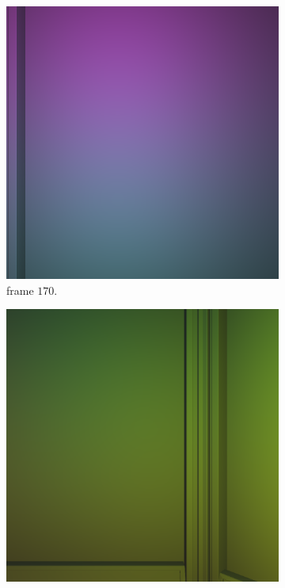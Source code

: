 \begin{figure}[tb]
  \centering
  \begin{subfigure}[b]{0.32\textwidth}
    \includegraphics[width=\textwidth]{./img/raw/fds-test-frames-example/si_170.png}
    \caption{frame $170$.}
    \label{fig:fds-test-frames-example:si:170}
  \end{subfigure}\quad %
  \begin{subfigure}[b]{0.32\textwidth}
    \includegraphics[width=\textwidth]{./img/raw/fds-test-frames-example/si_430.png}

\end{subfigure}
\end{figure}
